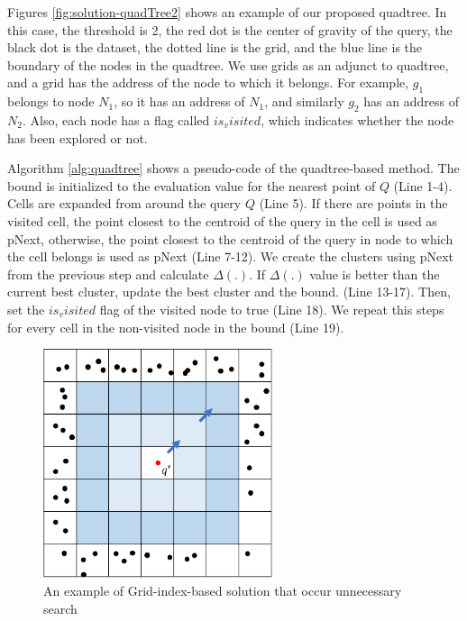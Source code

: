 \documentclass[a4paper,11pt]{report}
\theoremstyle{mytheoremstyle}
\begin{document}
Figures \ref{fig:solution-quadTree2} shows an example of our proposed quadtree. In this case, the threshold is 2, the red dot is the center of gravity of the query, the black dot is the dataset, the dotted line is the grid, and the blue line is the boundary of the nodes in the quadtree. We use grids as an adjunct to quadtree, and a grid has the address of the node to which it belongs. For example, $g_1$ belongs to node $N_1$, so it has an address of $N_1$, and similarly $g_2$ has an address of $N_2$. Also, each node has a flag called $is_visited$, which indicates whether the node has been explored or not.

Algorithm \ref{alg:quadtree} shows a pseudo-code of the quadtree-based method. The bound is initialized to the evaluation value for the nearest point of $Q$ (Line 1-4). Cells are expanded from around the query $Q$ (Line 5). If there are points in the visited cell, the point closest to the centroid of the query in the cell is used as pNext, otherwise, the point closest to the centroid of the query in node to which the cell belongs is used as pNext (Line 7-12). We create the clusters using pNext from the previous step and calculate $\Delta(.)$. If $\Delta(.)$ value is better than the current best cluster, update the best cluster and the bound. (Line 13-17). Then, set the $is_visited$ flag of the visited node to true (Line 18). We repeat this steps for every cell in the non-visited node in the bound (Line 19).

\begin{figure}
    \begin{center}
        \includegraphics[width=0.6\textwidth]{images/solution-QuadTree1.pdf}
        \caption{An example of Grid-index-based solution that occur unnecessary search} \label{fig:solution-quadTree1}
    \end{center}
\end{figure}
\end{document}
